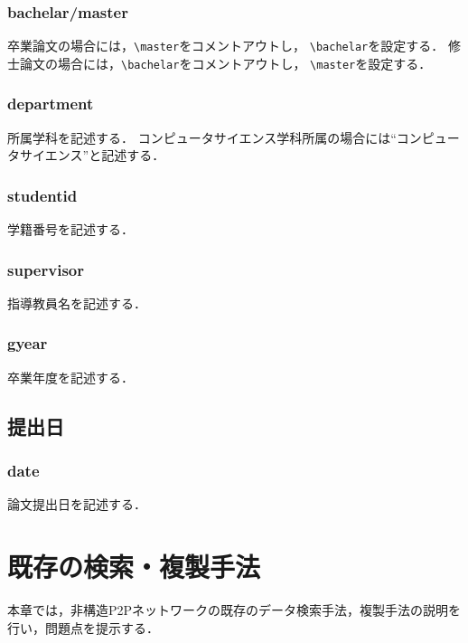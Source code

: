 \documentclass[11pt]{jreport}
\begin{document}
\subsection{bachelar/master}
卒業論文の場合には，\verb|\master|をコメントアウトし，
\verb|\bachelar|を設定する．
修士論文の場合には，\verb|\bachelar|をコメントアウトし，
\verb|\master|を設定する．

\subsection{department}
所属学科を記述する．
コンピュータサイエンス学科所属の場合には``コンピュータサイエンス''と記述する．

\subsection{studentid}
学籍番号を記述する．

\subsection{supervisor}
指導教員名を記述する．

\subsection{gyear}
卒業年度を記述する．

\section{提出日}
\subsection{date}
論文提出日を記述する．

\chapter{既存の検索・複製手法}
本章では，非構造P2Pネットワークの既存のデータ検索手法，複製手法の説明を行い，問題点を提示する．
\end{document}

